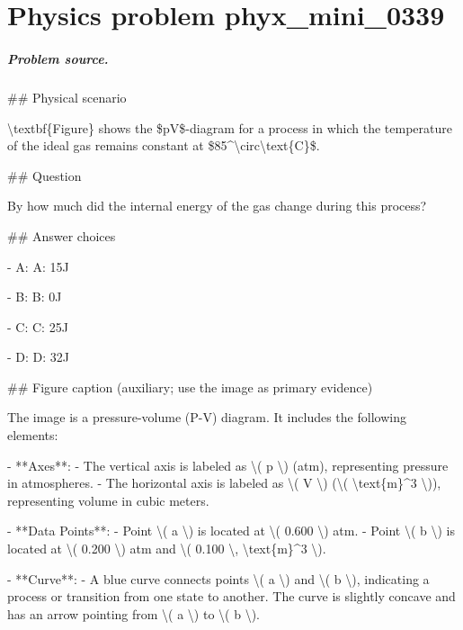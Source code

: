
\chapter{Physics problem phyx\_mini\_0339}
\label{ch:PhyXMiniProblems_problem_phyx_mini_0339}

\paragraph{Problem source.}
\#\# Physical scenario

\textbackslash{}textbf\{Figure\} shows the \$pV\$-diagram for a process in which the temperature of the ideal gas remains constant at \$85\textasciicircum{}\textbackslash{}circ\textbackslash{}text\{C\}\$.

\#\# Question

By how much did the internal energy of the gas change during this process?

\#\# Answer choices

- A: A: 15J

- B: B: 0J

- C: C: 25J

- D: D: 32J

\#\# Figure caption (auxiliary; use the image as primary evidence)

The image is a pressure-volume (P-V) diagram. It includes the following elements:

- **Axes**: 
  - The vertical axis is labeled as \textbackslash{}( p \textbackslash{}) (atm), representing pressure in atmospheres.
  - The horizontal axis is labeled as \textbackslash{}( V \textbackslash{}) (\textbackslash{}( \textbackslash{}text\{m\}\textasciicircum{}3 \textbackslash{})), representing volume in cubic meters.

- **Data Points**:
  - Point \textbackslash{}( a \textbackslash{}) is located at \textbackslash{}( 0.600 \textbackslash{}) atm.
  - Point \textbackslash{}( b \textbackslash{}) is located at \textbackslash{}( 0.200 \textbackslash{}) atm and \textbackslash{}( 0.100 \textbackslash{}, \textbackslash{}text\{m\}\textasciicircum{}3 \textbackslash{}).

- **Curve**: 
  - A blue curve connects points \textbackslash{}( a \textbackslash{}) and \textbackslash{}( b \textbackslash{}), indicating a process or transition from one state to another. The curve is slightly concave and has an arrow pointing from \textbackslash{}( a \textbackslash{}) to \textbackslash{}( b \textbackslash{}).

